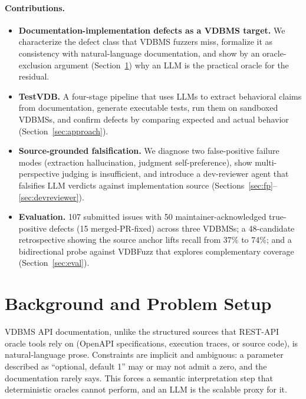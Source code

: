 \documentclass[sigconf]{acmart}
\begin{document}
\paragraph{Contributions.}
\begin{itemize}
  \item \textbf{Documentation-implementation defects as a VDBMS target.} We characterize the defect class that VDBMS fuzzers miss, formalize it as consistency with natural-language documentation, and show by an oracle-exclusion argument (Section~\ref{sec:background}) why an LLM is the practical oracle for the residual.
  \item \textbf{TestVDB.} A four-stage pipeline that uses LLMs to extract behavioral claims from documentation, generate executable tests, run them on sandboxed VDBMSs, and confirm defects by comparing expected and actual behavior (Section~\ref{sec:approach}).
  \item \textbf{Source-grounded falsification.} We diagnose two false-positive failure modes (extraction hallucination, judgment self-preference), show multi-perspective judging is insufficient, and introduce a dev-reviewer agent that falsifies LLM verdicts against implementation source (Sections~\ref{sec:fp}--\ref{sec:devreviewer}).
  \item \textbf{Evaluation.} 107 submitted issues with 50 maintainer-acknowledged true-positive defects (15 merged-PR-fixed) across three VDBMSs; a 48-candidate retrospective showing the source anchor lifts recall from 37\% to 74\%; and a bidirectional probe against VDBFuzz that explores complementary coverage (Section~\ref{sec:eval}).
\end{itemize}

\section{Background and Problem Setup}
\label{sec:background}

VDBMS API documentation, unlike the structured sources that REST-API oracle tools rely on (OpenAPI specifications, execution traces, or source code), is natural-language prose. Constraints are implicit and ambiguous: a parameter described as ``optional, default 1'' may or may not admit a zero, and the documentation rarely says. This forces a semantic interpretation step that deterministic oracles cannot perform, and an LLM is the scalable proxy for it.
\end{document}
